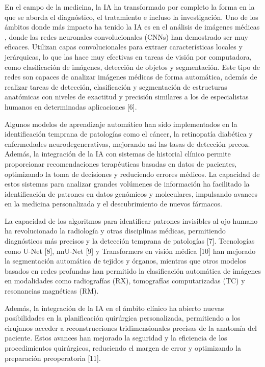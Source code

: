 En el campo de la medicina, la IA ha transformado por completo la forma en la que se aborda el diagnóstico, el tratamiento e incluso la investigación. Uno de los ámbitos donde más impacto ha tenido la IA es en el análisis de imágenes médicas , donde las redes neuronales convolucionales (CNNs)  han demostrado ser muy eficaces. Utilizan capas convolucionales para extraer características locales y jerárquicas, lo que las hace muy efectivas en tareas de visión por computadora, como clasificación de imágenes, detección de objetos y segmentación. Este tipo de redes son capaces de analizar imágenes médicas de forma automática, además de realizar tareas de detección, clasificación y segmentación de estructuras anatómicas con niveles de exactitud y precisión similares a los de especialistas humanos en determinadas aplicaciones [6].

Algunos modelos de aprendizaje automático han sido implementados en la identificación temprana de patologías como el cáncer, la retinopatía diabética y enfermedades neurodegenerativas, mejorando así las tasas de detección precoz. Además, la integración de la IA con sistemas de historial clínico permite proporcionar recomendaciones terapéuticas basadas en datos de pacientes, optimizando la toma de decisiones y reduciendo errores médicos. La capacidad de estos sistemas para analizar grandes volúmenes de información ha facilitado la identificación de patrones en datos genómicos y moleculares, impulsando avances en la medicina personalizada y el descubrimiento de nuevos fármacos.

La capacidad de los algoritmos para identificar patrones invisibles al ojo humano ha revolucionado la radiología y otras disciplinas médicas, permitiendo diagnósticos más precisos y la detección temprana de patologías [7]. Tecnologías como U-Net [8], nnU-Net [9] y Transformers en visión médica [10] han mejorado la segmentación automática de tejidos y órganos, mientras que otros modelos basados en redes profundas han permitido la clasificación automática de imágenes en modalidades como radiografías (RX), tomografías computarizadas (TC) y resonancias magnéticas (RM).

Además, la integración de la IA en el ámbito clínico ha abierto nuevas posibilidades en la planificación quirúrgica personalizada, permitiendo a los cirujanos acceder a reconstrucciones tridimensionales precisas de la anatomía del paciente. Estos avances han mejorado la seguridad y la eficiencia de los procedimientos quirúrgicos, reduciendo el margen de error y optimizando la preparación preoperatoria [11].

